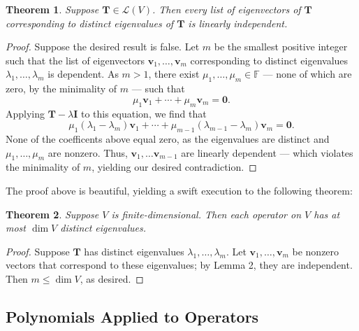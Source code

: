 \documentclass[11pt]{article}
\renewcommand{\vec}[1]{\mathbf{#1}}
\newcommand{\mat}[1]{\mathbf{#1}}
\newtheorem{theorem}{Theorem}
\begin{document}
\begin{theorem}
	Suppose $\mat{T} \in \mathcal{L}(V)$. Then every list of eigenvectors of $\mat{T}$ corresponding to distinct eigenvalues of $\mat{T}$ is linearly independent.
\end{theorem}
\begin{adjustwidth}{1cm}{}
    \begin{proof}
		Suppose the desired result is false. Let $m$ be the smallest positive integer such that the list of eigenvectors $\vec{v}_{1}, \ldots, \vec{v}_{m}$ corresponding to distinct eigenvalues $\lambda_{1}, \ldots, \lambda_{m}$ is dependent. As $m > 1$, there exist $\mu_{1}, \ldots, \mu_{m} \in \mathbb{F}$ --- none of which are zero, by the minimality of $m$ --- such that
		\[
			\mu_{1} \vec{v}_{1} + \cdots + \mu_{m} \vec{v}_{m} = \vec{0}.
		\]
		Applying $\mat{T} - \lambda \mat{I}$ to this equation, we find that
		\[
			\mu_{1} (\lambda_{1} - \lambda_{m}) \vec{v}_{1} + \cdots + \mu_{m - 1} (\lambda_{m - 1} - \lambda_{m}) \vec{v}_{m} = \vec{0}.
		\]
		None of the coefficents above equal zero, as the eigenvalues are distinct and $\mu_{1}, \ldots, \mu_{m}$ are nonzero. Thus, $\vec{v}_{1}, \ldots \vec{v}_{m - 1}$ are linearly dependent --- which violates the minimality of $m$, yielding our desired contradiction.
	\end{proof}
\end{adjustwidth}

The proof above is beautiful, yielding a swift execution to the following theorem:

\begin{theorem}
	Suppose $V$ is finite-dimensional. Then each operator on $V$ has at most $\dim V$ distinct eigenvalues.	
\end{theorem}
\begin{adjustwidth}{1cm}{}
    \begin{proof}
		Suppose $\mat{T}$ has distinct eigenvalues $\lambda_{1}, \ldots, \lambda_{m}$. Let $\vec{v}_{1}, \ldots, \vec{v}_{m}$ be nonzero vectors that correspond to these eigenvalues; by Lemma 2, they are independent. Then $m \le \dim V$, as desired.
	\end{proof}
\end{adjustwidth}


\subsection{Polynomials Applied to Operators}
\end{document}
